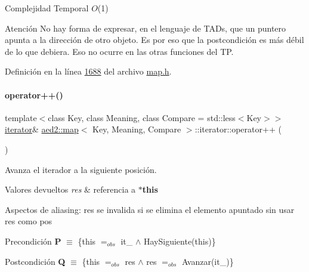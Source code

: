 \begin{DoxyDescription}
\item[Complejidad Temporal]$O$(1)
\end{DoxyDescription}

\begin{DoxyAttention}{Atención}
No hay forma de expresar, en el lenguaje de T\+A\+Ds, que un puntero apunta a la dirección de otro objeto. Es por eso que la postcondición es más débil de lo que debiera. Eso no ocurre en las otras funciones del TP. 
\end{DoxyAttention}


Definición en la línea \hyperlink{map_8h_source_l01688}{1688} del archivo \hyperlink{map_8h_source}{map.\+h}.

\mbox{\label{classaed2_1_1map_1_1iterator_a7c44de7f0508186e135ddbcfe782fec5_a7c44de7f0508186e135ddbcfe782fec5}} 
\paragraph{\texorpdfstring{operator++()}{operator++()}\hspace{0.1cm}{\footnotesize\ttfamily [1/2]}}
{\footnotesize\ttfamily template$<$class Key, class Meaning, class Compare = std\+::less$<$\+Key$>$$>$ \\
\hyperlink{classaed2_1_1map_1_1iterator}{iterator}\& \hyperlink{classaed2_1_1map}{aed2\+::map}$<$ Key, Meaning, Compare $>$\+::iterator\+::operator++ (\begin{DoxyParamCaption}{ }\end{DoxyParamCaption})\hspace{0.3cm}{\ttfamily [inline]}}



Avanza el iterador a la siguiente posición. 


\begin{DoxyRetVals}{Valores devueltos}
{\em res} & referencia a {\bfseries $\ast$this}\\
\hline
\end{DoxyRetVals}
\begin{DoxyParagraph}{Aspectos de aliasing\+:}
res se invalida si se elimina el elemento apuntado sin usar res como pos
\end{DoxyParagraph}
\begin{DoxyPrecond}{Precondición}
{\bfseries P} $\equiv$ \{this $=_{obs}$ it\+\_ $\land$ Hay\+Siguiente(this)\} 
\end{DoxyPrecond}
\begin{DoxyPostcond}{Postcondición}
{\bfseries Q} $\equiv$ \{this $=_{obs}$ res $\land$ res $=_{obs}$ Avanzar(it\+\_)\}
\end{DoxyPostcond}

